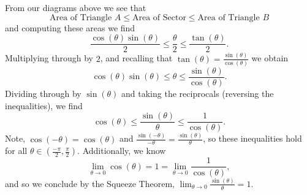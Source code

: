 \documentclass{ximera}
\begin{document}
\begin{example}
From our diagrams above we see that
\[
\text{Area of Triangle $A$} \le \text{Area of Sector} \le \text{Area of Triangle $B$}
\]
and computing these areas we find
\[
\frac{\cos(\theta)\sin(\theta)}{2} \le \frac{\theta}{2} \le \frac{\tan(\theta)}{2}.
\]
Multiplying through by $2$, and recalling that $\tan(\theta) =
\frac{\sin(\theta)}{\cos(\theta)}$ we obtain
\[
\cos(\theta)\sin(\theta) \le \theta \le \frac{\sin(\theta)}{\cos(\theta)}.
\]
Dividing through by $\sin(\theta)$ and taking the reciprocals
(reversing the inequalities), we find
\[
\cos(\theta) \le \frac{\sin(\theta)}{\theta} \le \frac{1}{\cos(\theta)}.
\]
Note, $\cos(-\theta) = \cos(\theta)$ and $\frac{\sin(-\theta)}{-\theta} =
\frac{\sin(\theta)}{\theta}$, so these inequalities hold for all $\theta\in
\left(\frac{-\pi}{2}, \frac{\pi}{2}\right)$.  Additionally, we know
\[
\lim_{\theta \to 0}\cos(\theta) = 1 = \lim_{\theta\to 0}\frac{1}{\cos(\theta)},
\]
and so we conclude by the Squeeze Theorem, $\lim_{\theta \to
  0}\frac{\sin(\theta)}{\theta} = 1$.
\end{example}
\end{document}
